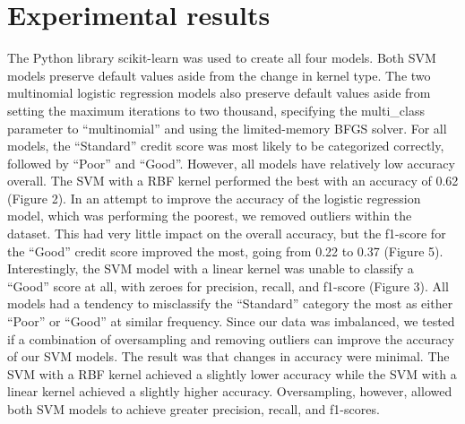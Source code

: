 \documentclass[conference, 11pt]{IEEEtran}
\begin{document}
\section{Experimental results}
The Python library scikit-learn was used to create all four models. Both SVM models preserve default values aside from the change
in kernel type. The two multinomial logistic regression models also preserve default values aside from setting the maximum iterations
to two thousand, specifying the multi\_class parameter to ``multinomial'' and using the limited-memory BFGS solver.
For all models, the ``Standard'' credit score was most likely to be categorized correctly, followed by ``Poor'' and ``Good''. 
However, all models have relatively low accuracy overall. The SVM with a RBF kernel performed the best with an
accuracy of 0.62 (Figure 2). \vspace{5mm}\newline
In an attempt to improve the accuracy of the logistic regression model, which was performing the poorest, we removed outliers within the dataset.
This had very little impact on the overall accuracy, but the f1-score for the ``Good'' credit score improved the most, going from 0.22 to 0.37 (Figure 5).
Interestingly, the SVM model with a linear kernel was unable to classify a ``Good'' score at all, with zeroes for precision, 
recall, and f1-score (Figure 3). All models had a tendency to misclassify the ``Standard'' category the most as either ``Poor'' or 
``Good'' at similar frequency.\vspace{5mm}\newline
Since our data was imbalanced, we tested if a combination of oversampling and removing outliers can improve the accuracy of our SVM models. 
The result was that changes in accuracy were minimal. The SVM with a RBF kernel achieved a slightly lower accuracy while the SVM with a linear kernel
achieved a slightly higher accuracy. Oversampling, however, allowed both SVM models to achieve greater precision, recall,
and f1-scores.
\end{document}
